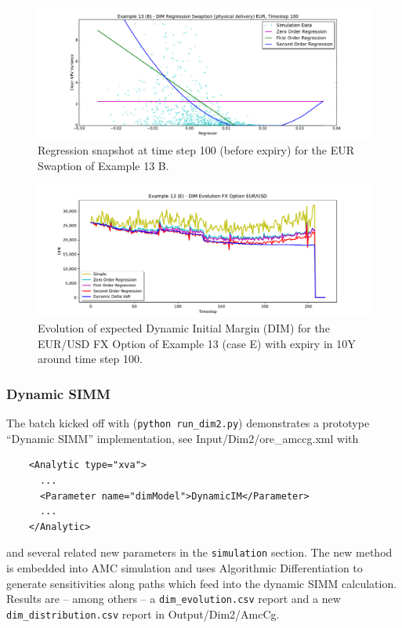 \begin{figure}[h!]
\begin{center}
\includegraphics[scale=0.45]{examples/mpl_dim_regression_B_swaption_eur_t100.pdf}
\end{center}
\caption{Regression snapshot at time step 100 (before expiry) for the EUR Swaption of Example 13 B.}
\label{fig_ex13b_regression}
\end{figure}

\begin{figure}[h!]
\begin{center}
\includegraphics[scale=0.45]{examples/mpl_dim_evolution_E_fxopt.pdf}
\end{center}
\caption{Evolution of expected Dynamic Initial Margin (DIM) for the EUR/USD FX Option of Example 13 (case E) with expiry in 10Y
  around time step 100.}
\label{fig_ex13c_evolution}
\end{figure}

\subsubsection{Dynamic SIMM}

The batch kicked off with ({\tt python run\_dim2.py}) demonstrates a prototype ``Dynamic SIMM'' implementation,
see Input/Dim2/ore\_amccg.xml with
\begin{listing}[H]
\begin{verbatim}
    <Analytic type="xva">
      ...
      <Parameter name="dimModel">DynamicIM</Parameter>
      ...
    </Analytic>
\end{verbatim}
\end{listing}
and several related new parameters in the {\tt simulation} section. The new method is embedded into AMC simulation
and uses Algorithmic Differentiation to generate sensitivities along paths which feed into the dynamic SIMM
calculation. Results are -- among others -- a {\tt dim\_evolution.csv} report and a new {\tt dim\_distribution.csv}
report in Output/Dim2/AmcCg.

